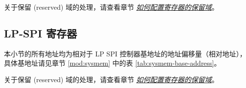 \documentclass[main\_\_CN.tex]{subfiles}
\begin{document}
关于保留 (reserved) 域的处理，请查看章节 \hyperref[programming-reserved-field]{\textit{如何配置寄存器的保留域}}。



\subsection{LP-SPI 寄存器}
本小节的所有地址均为相对于 LP SPI 控制器基地址的地址偏移量（相对地址），具体基地址请见章节 \ref{mod:sysmem} \textit{} 中的表 \ref{tab:sysmem-base-address}。

关于保留 (reserved) 域的处理，请查看章节 \hyperref[programming-reserved-field]{\textit{如何配置寄存器的保留域}}。


\end{document}
